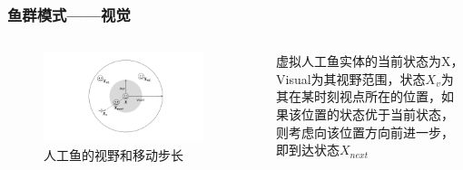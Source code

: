 \begin{frame}
	\frametitle{鱼群模式——视觉}
	\begin{columns}
		\begin{figure}
			\centering
			\includegraphics[width=0.9\textwidth]{pic/fish1.pdf}
			\caption{人工鱼的视野和移动步长}
		\end{figure}
	虚拟人工鱼实体的当前状态为X，Visual为其视野范围，状态$X_v$为其在某时刻视点所在的位置，如果该位置的状态优于当前状态，则考虑向该位置方向前进一步，即到达状态$X_{next}$
	\end{columns}
\end{frame}

